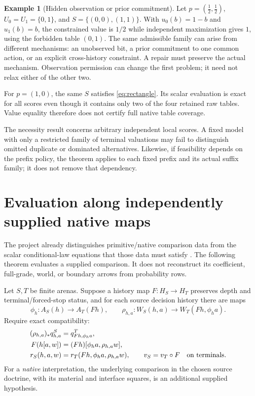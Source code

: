 \documentclass[11pt]{article}
\theoremstyle{definition}
\newtheorem{example}[theorem]{Example}
\begin{document}
\begin{example}[Hidden observation or prior commitment]
\label{ex:diagonal}
Let \(p=(\tfrac12,\tfrac12)\), \(U_0=U_1=\{0,1\}\), and
\(S=\{(0,0),(1,1)\}\). With \(u_0(b)=1-b\) and \(u_1(b)=b\),
the constrained value is \(1/2\) while independent maximization gives
\(1\), using the forbidden table \((0,1)\). The same admissible family
can arise from different mechanisms: an unobserved bit, a prior commitment
to one common action, or an explicit cross-history constraint. A repair
must preserve the actual mechanism. Observation permission can change the
first problem; it need not relax either of the other two.

For \(p=(1,0)\), the same \(S\) satisfies \eqref{eq:rectangle}.
Its scalar evaluation is exact for all scores even though it contains only
two of the four retained raw tables. Value equality therefore does not
certify full native table coverage.
\end{example}

The necessity result concerns arbitrary independent local scores. A fixed
model with only a restricted family of terminal valuations may fail to
distinguish omitted duplicate or dominated alternatives. Likewise, if
feasibility depends on the prefix policy, the theorem applies to each
fixed prefix and its actual suffix family; it does not remove that
dependency.

\section{Evaluation along independently supplied native maps}
\label{sec:native}
The project already distinguishes primitive/native comparison data from
the scalar conditional-law equations that those data must satisfy
\cite{conditional,relative}. The following theorem evaluates a supplied
comparison. It does not reconstruct its coefficient, full-grade, world,
or boundary arrows from probability rows.

Let \(S,T\) be finite arenas. Suppose a history map \(F:H_S\to H_T\)
preserves depth and terminal/forced-stop status, and for each source
decision history there are maps
\[
 \phi_h:A_S(h)\to A_T(Fh),\qquad
 \rho_{h,a}:W_S(h,a)\to W_T(Fh,\phi_h a).
\]
Require exact compatibility:
\begin{align}
 (\rho_{h,a})_*q^S_{h,a}&=q^T_{Fh,\phi_h a},
       \label{eq:push}\\
 F(h[a,w])&=(Fh)[\phi_h a,\rho_{h,a}w], \label{eq:body}\\
 r_S(h,a,w)&=r_T(Fh,\phi_h a,\rho_{h,a}w),\qquad
 v_S=v_T\circ F\quad\hbox{on terminals}. \label{eq:reward}
\end{align}
For a \emph{native} interpretation, the underlying comparison in the
chosen source doctrine, with its material and interface squares, is an
additional supplied hypothesis.
\end{document}
